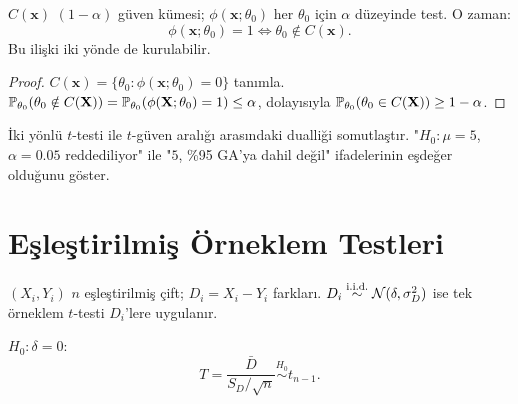 \begin{teorem}[Duallik]\label{thm:duallik}
$C(\mathbf{x})$ $(1-\alpha)$ güven kümesi; $\phi(\mathbf{x};\theta_0)$ her $\theta_0$ için $\alpha$ düzeyinde test. O zaman:
\[
  \phi(\mathbf{x};\theta_0) = 1 \iff \theta_0\notin C(\mathbf{x}).
\]
Bu ilişki iki yönde de kurulabilir.
\end{teorem}

\begin{proof}
$C(\mathbf{x}) = \{\theta_0: \phi(\mathbf{x};\theta_0)=0\}$ tanımla. $\mathbb{P}_{\theta_0}(\theta_0\notin C(\mathbf{X})) = \mathbb{P}_{\theta_0}(\phi(\mathbf{X};\theta_0)=1)\leq\alpha$, dolayısıyla $\mathbb{P}_{\theta_0}(\theta_0\in C(\mathbf{X}))\geq1-\alpha$.
\end{proof}

\begin{kendinleifade}
İki yönlü $t$-testi ile $t$-güven aralığı arasındaki dualliği somutlaştır. "$H_0:\mu=5$, $\alpha=0.05$ reddediliyor" ile "$5$, \%95 GA'ya dahil değil" ifadelerinin eşdeğer olduğunu göster.
\end{kendinleifade}

\section{Eşleştirilmiş Örneklem Testleri}
\label{sec:eslestirme}

\begin{tanim}\label{def:eslestirme}
$(X_i,Y_i)$ $n$ eşleştirilmiş çift; $D_i=X_i-Y_i$ farkları. $D_i\overset{\text{i.i.d.}}{\sim}\mathcal{N}(\delta,\sigma_D^2)$ ise tek örneklem $t$-testi $D_i$'lere uygulanır.
\end{tanim}

\begin{teorem}\label{thm:eslestirme_t}
$H_0:\delta=0$:
\[
  T = \frac{\bar{D}}{S_D/\sqrt{n}} \overset{H_0}{\sim} t_{n-1}.
\]
\end{teorem}

